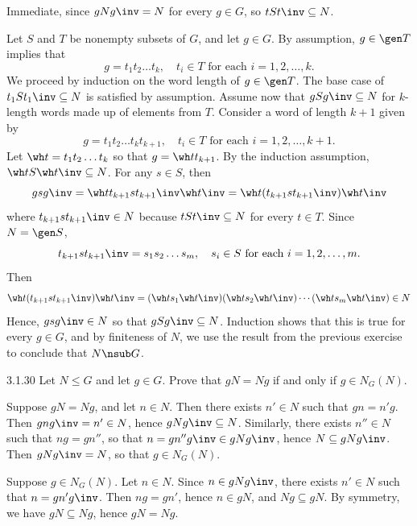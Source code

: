 \begin{soliff}
    \rightimp Immediate, since $gNg\inv = N$ for every $g \in G$, so $tSt\inv \subseteq N$.

    \leftimp Let $S$ and $T$ be nonempty subsets of $G$, and let $g \in G$.
	By assumption, $g \in \gen T$ implies that
    \[
    	g = t_1t_2 \dots t_k, \quad t_i \in T \text{ for each } i = 1, 2, \ldots, k.
    \]
    We proceed by induction on the word length of $g \in \gen T$.
	The base case of $t_1St_1\inv \subseteq N$ is satisfied by assumption.
	Assume now that $gSg\inv \subseteq N$ for $k$-length words made up of elements from $T$.
	Consider a word of length $k + 1$ given by 
    \[
    	g = t_1t_2 \ldots t_kt_{k + 1}, \quad t_i \in T \text{ for each } i = 1, 2, \ldots, k + 1.
    \]
    Let $\wh t = t_1t_2 \ldots t_k$ so that $g = \wh tt_{k + 1}$.
	By the induction assumption, $\wh tS\wh t\inv \subseteq N$.
	For any $s \in S$, then 
    \[
    	gsg\inv = \wh tt_{k + 1}st_{k + 1}\inv \wh t\inv = \wh t(t_{k + 1}st_{k + 1}\inv)\wh t\inv
    \]
    where $t_{k + 1}st_{k + 1}\inv \in N$ because $tSt\inv \subseteq N$ for every $t \in T$.
	Since $N = \gen S$,
    \[
    	t_{k + 1}st_{k + 1}\inv = s_1s_2 \ldots s_m, \quad s_i \in S \text{ for each } i = 1, 2, \ldots, m.
    \]
    Then
    \[
    	\wh t(t_{k + 1}st_{k + 1}\inv)\wh t\inv = (\wh ts_1\wh t\inv)(\wh ts_2 \wh t\inv) \cdots (\wh ts_m \wh t\inv) \in N
    \]
    Hence, $gsg\inv \in N$ so that $gSg\inv \subseteq N$.
	Induction shows that this is true for every $g \in G$, and by finiteness of $N$, we use the result from the previous exercise to conclude that $N \nsub G$.
\end{soliff}

\begin{exercise}{3.1.30}
    Let $N \le G$ and let $g \in G$.
	Prove that $gN = Ng$ if and only if $g \in N_G(N)$.
\end{exercise}

\begin{soliff}
    \rightimp Suppose $gN = Ng$, and let $n \in N$.
    Then there exists $n' \in N$ such that $gn = n'g$.
    Then $gng\inv = n' \in N$, hence $gNg\inv \subseteq N$.
    Similarly, there exists $n'' \in N$ such that $ng = gn''$, so that $n = gn''g\inv \in gNg\inv$, hence $N \subseteq gNg\inv$.
    Then $gNg\inv = N$, so that $g \in N_G(N)$.

    \leftimp Suppose $g \in N_G(N)$.
	Let $n \in N$.
	Since $n \in gNg\inv$, there exists $n' \in N$ such that $n = gn'g\inv$.
	Then $ng = gn'$, hence $n \in gN$, and $Ng \subseteq gN$.
	By symmetry, we have $gN \subseteq Ng$, hence $gN = Ng$.
\end{soliff}


